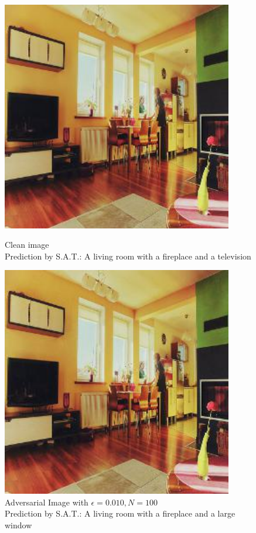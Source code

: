 \begin{figure}[ht]
    \centering
    \begin{minipage}{0.45\textwidth}
        \centering
        \includegraphics[width=0.9\textwidth]{figures/Distract/n=100/samples/0.000/img_0.jpg} %
        \caption*{Clean image\\Prediction by S.A.T.: A living room with a fireplace and a television}
    \end{minipage}\hfill
    \begin{minipage}{0.45\textwidth}
        \centering
        \includegraphics[width=0.9\textwidth]{figures/Distract/n=100/samples/0.010/img_0.jpg} %
        \caption*{Adversarial Image with $\epsilon=0.010, N=100$\\Prediction by S.A.T.: A living room with a fireplace and a large window}
    \end{minipage}
\end{figure}

